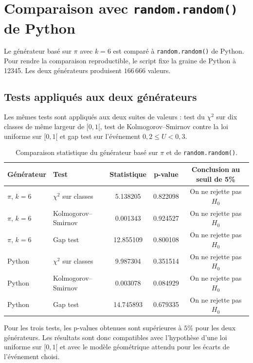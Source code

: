 \documentclass[11pt,a4paper]{report}
\begin{document}
\chapter{Comparaison avec \texttt{random.random()} de Python}

Le générateur basé sur $\pi$ avec $k=6$ est comparé à \texttt{random.random()} de Python. Pour rendre la comparaison reproductible, le script fixe la graine de Python à 12345. Les deux générateurs produisent $166\,666$ valeurs.

\section{Tests appliqués aux deux générateurs}

Les mêmes tests sont appliqués aux deux suites de valeurs : test du $\chi^2$ sur dix classes de même largeur de $[0,1[$, test de Kolmogorov--Smirnov contre la loi uniforme sur $[0,1[$ et gap test sur l'événement $0{,}2 \leq U < 0{,}3$.

\begin{table}[H]
\centering
\begin{tabular}{llccc}
\toprule
Générateur & Test & Statistique & p-value & Conclusion au seuil de 5\% \\
\midrule
$\pi$, $k=6$ & $\chi^2$ sur classes & 5.138205 & 0.822098 & On ne rejette pas $H_0$ \\
$\pi$, $k=6$ & Kolmogorov--Smirnov & 0.001343 & 0.924527 & On ne rejette pas $H_0$ \\
$\pi$, $k=6$ & Gap test & 12.855109 & 0.800108 & On ne rejette pas $H_0$ \\
Python & $\chi^2$ sur classes & 9.987304 & 0.351514 & On ne rejette pas $H_0$ \\
Python & Kolmogorov--Smirnov & 0.003078 & 0.084929 & On ne rejette pas $H_0$ \\
Python & Gap test & 14.745893 & 0.679335 & On ne rejette pas $H_0$ \\
\bottomrule
\end{tabular}
\caption{Comparaison statistique du générateur basé sur $\pi$ et de \texttt{random.random()}.}
\label{tab:generator_comparison}
\end{table}

Pour les trois tests, les p-values obtenues sont supérieures à $5\%$ pour les deux générateurs. Les résultats sont donc compatibles avec l'hypothèse d'une loi uniforme sur $[0,1[$ et avec le modèle géométrique attendu pour les écarts de l'événement choisi.
\end{document}
